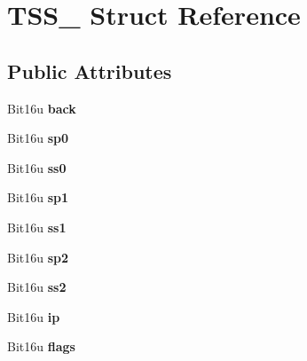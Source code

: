 \hypertarget{structTSS__16}{\section{T\-S\-S\-\_ Struct Reference}
\label{structTSS__16}
}
\subsection*{Public Attributes}
\begin{DoxyCompactItemize}
\item 
\hypertarget{structTSS__16_aacd96257bd7574efaef087ce9ecd9008}{Bit16u {\bfseries back}}\label{structTSS__16_aacd96257bd7574efaef087ce9ecd9008}

\item 
\hypertarget{structTSS__16_ae5cd384c1cca7ea2adb6d991f88c0aa7}{Bit16u {\bfseries sp0}}\label{structTSS__16_ae5cd384c1cca7ea2adb6d991f88c0aa7}

\item 
\hypertarget{structTSS__16_ad2fdf570ff05fe758fbb4746499dbc8d}{Bit16u {\bfseries ss0}}\label{structTSS__16_ad2fdf570ff05fe758fbb4746499dbc8d}

\item 
\hypertarget{structTSS__16_a1116981ae4a4ea6e16e99dfef3b97443}{Bit16u {\bfseries sp1}}\label{structTSS__16_a1116981ae4a4ea6e16e99dfef3b97443}

\item 
\hypertarget{structTSS__16_ae7197dc1d7325d5a6fd67bf9904b850d}{Bit16u {\bfseries ss1}}\label{structTSS__16_ae7197dc1d7325d5a6fd67bf9904b850d}

\item 
\hypertarget{structTSS__16_af04fb34c813ffd77e5e920210432d751}{Bit16u {\bfseries sp2}}\label{structTSS__16_af04fb34c813ffd77e5e920210432d751}

\item 
\hypertarget{structTSS__16_ae96123b6f268f921412eeab9c38db699}{Bit16u {\bfseries ss2}}\label{structTSS__16_ae96123b6f268f921412eeab9c38db699}

\item 
\hypertarget{structTSS__16_a8241584d439cd1bb42607bf4a5e3caa7}{Bit16u {\bfseries ip}}\label{structTSS__16_a8241584d439cd1bb42607bf4a5e3caa7}

\item 
\hypertarget{structTSS__16_a6b667b1aaf4c614ba572e4a8a4a50553}{Bit16u {\bfseries flags}}\label{structTSS__16_a6b667b1aaf4c614ba572e4a8a4a50553}


\end{DoxyCompactItemize}
